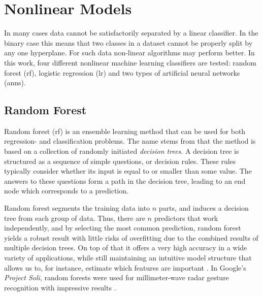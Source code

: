 \section{Nonlinear Models}

In many cases data cannot be satisfactorily separated by a linear classifier. In the binary case this means that two classes in a dataset cannot be properly split by any one hyperplane. For such data non-linear algorithms may perform better. In this work, four different nonlinear machine learning classifiers are tested: random forest (\gls{rf}), logistic regression (\gls{lr}) and two types of artificial neural networks (\gls{ann}s). 



\subsection{Random Forest}
Random forest (\gls{rf}) is an ensemble learning method that can be used for both regression- and classification problems. The name stems from that the method is based on a collection of randomly initiated \textit{decision trees}. A decision tree is structured as a sequence of simple questions, or decision rules. These rules typically consider whether its input is equal to or smaller than some value. The answers to these questions form a path in the decision tree, leading to an end node which corresponds to a prediction.

Random forest segments the training data into $n$ parts, and induces a decision tree from each group of data. Thus, there are $n$ predictors that work independently, and by selecting the most common prediction, random forest yields a robust result with little risks of overfitting due to the combined results of multiple decision trees. On top of that it offers a very high accuracy in a wide variety of applications, while still maintaining an intuitive model structure that allows us to, for instance, estimate which features are important \citep{breiman_2002}. In Google's \emph{Project Soli}, random forests were used for millimeter-wave radar gesture recognition with impressive results \citep{lien_gillian_karagozler_amihood_schwesig_olson_raja_poupyrev_2016}. 


